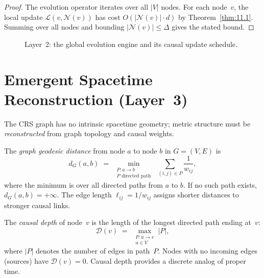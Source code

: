 \begin{proof}
The evolution operator iterates over all $|V|$ nodes.  For each
node~$v$, the local update $\mathcal{L}(v, \mathcal{N}(v))$ has
cost $O(|\mathcal{N}(v)| \cdot d)$ by Theorem~\ref{thm:11.1}.
Summing over all nodes and bounding $|\mathcal{N}(v)| \leq \Delta$
gives the stated bound.
\end{proof}

\begin{figure}[t]
\centering
{}
\caption{Layer~2: the global evolution engine and its causal
  update schedule.}
\label{fig:c11:evolution}
\end{figure}

\section{Emergent Spacetime Reconstruction (Layer~3)}
\label{sec:ch11:spacetime}

The CRS graph has no intrinsic spacetime geometry; metric structure
must be \emph{reconstructed} from graph topology and causal weights.

\begin{definition}
\label{def:11.16}
The \emph{graph geodesic distance} from node $a$ to node $b$ in
$G = (V, E)$ is
\begin{equation}
\label{eq:11.geodesic}
  d_G(a, b) \;=\;
  \min_{\substack{P \colon a \to b \\ P \text{ directed path}}}
  \;\sum_{(i,j) \in P} \frac{1}{w_{ij}},
\end{equation}
where the minimum is over all directed paths from $a$ to $b$.
If no such path exists, $d_G(a, b) = +\infty$.  The edge length
$\ell_{ij} = 1/w_{ij}$ assigns shorter distances to stronger
causal links.
\end{definition}

\begin{definition}
\label{def:11.17}
The \emph{causal depth} of node~$v$ is the length of the longest
directed path ending at~$v$:
\begin{equation}
\label{eq:11.causal_depth}
  \mathcal{D}(v) \;=\;
  \max_{\substack{P \colon u \to v \\ u \in V}}
  |P|,
\end{equation}
where $|P|$ denotes the number of edges in path~$P$.  Nodes with no
incoming edges (sources) have $\mathcal{D}(v) = 0$.  Causal depth
provides a discrete analog of proper time.
\end{definition}


